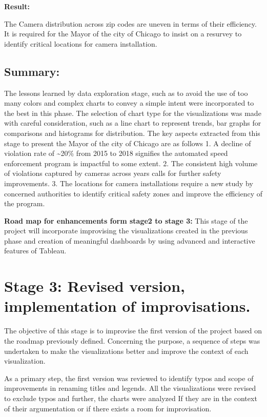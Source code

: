 \documentclass[]{book}
\begin{document}
\textbf{Result:}

The Camera distribution across zip codes are uneven in terms of their efficiency. It is required for the Mayor of the city of Chicago to insist on a resurvey to identify critical locations for camera installation.

\hypertarget{summary}{%
\section{Summary:}\label{summary}}

The lessons learned by data exploration stage, such as to avoid the use of too many colors and complex charts to convey a simple intent were incorporated to the best in this phase. The selection of chart type for the visualizations was made with careful consideration, such as a line chart to represent trends, bar graphs for comparisons and histograms for distribution.
The key aspects extracted from this stage to present the Mayor of the city of Chicago are as follows
1. A decline of violation rate of \textasciitilde{}20\% from 2015 to 2018 signifies the automated speed enforcement program is impactful to some extent.
2. The consistent high volume of violations captured by cameras across years calls for further safety improvements.
3. The locations for camera installations require a new study by concerned authorities to identify critical safety zones and improve the efficiency of the program.

\textbf{Road map for enhancements form stage2 to stage 3:}
This stage of the project will incorporate improvising the visualizations created in the previous phase and creation of meaningful dashboards by using advanced and interactive features of Tableau.

\hypertarget{stage-3-revised-version-implementation-of-improvisations.}{%
\chapter{Stage 3: Revised version, implementation of improvisations.}\label{stage-3-revised-version-implementation-of-improvisations.}}

The objective of this stage is to improvise the first version of the project based on the roadmap previously defined. Concerning the purpose, a sequence of steps was undertaken to make the visualizations better and improve the context of each visualization.

As a primary step, the first version was reviewed to identify typos and scope of improvements in renaming titles and legends. All the visualizations were revised to exclude typos and further, the charts were analyzed If they are in the context of their argumentation or if there exists a room for improvisation.
\end{document}
